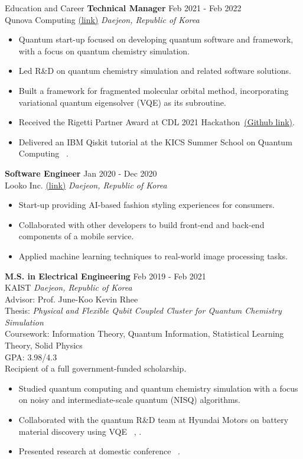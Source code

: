 \documentclass{resume} %
\newcommand*{\AddCiteToCategory}[1]{%
  \AtNextCite{\AtEachCitekey{#1}}}
\newcommand{\citeJour}{\AddCiteToCategory{J}\cite}
\newcommand{\citePate}{\AddCiteToCategory{P}\cite}
\newcommand{\citeConf}{\AddCiteToCategory{C}\cite}
\begin{document}
\begin{rSection}{Education and Career}
{\bf Technical Manager} \hfill {Feb 2021 - Feb 2022}\\
Qunova Computing \href{https://qunovacomputing.com/}{(link)} \hfill \textit{Daejeon, Republic of Korea}
 \begin{itemize}
    \itemsep -3pt {} 
     \item Quantum start-up focused on developing quantum software and framework, with a focus on quantum chemistry simulation.
     \item Led R\&D on quantum chemistry simulation and related software solutions.
     \item Built a framework for fragmented molecular orbital method, incorporating variational quantum eigensolver (VQE) as its subroutine.
     \item Received the Rigetti Partner Award at CDL 2021 Hackathon~\href{https://github.com/CDL-Quantum/Hackathon2021}{(Github link)}.
     \item Delivered an IBM Qiskit tutorial at the KICS Summer School on Quantum Computing~\citeConf{KICS2021Tutorial}.
 \end{itemize}

{\bf Software Engineer} \hfill Jan 2020 - Dec 2020\\
Looko Inc. \href{https://www.acloset.app/}{(link)} \hfill \textit{Daejeon, Republic of Korea}
 \begin{itemize}
    \itemsep -3pt {} 
    \item Start-up providing AI-based fashion styling experiences for consumers.
    \item Collaborated with other developers to build front-end and back-end components of a mobile service.
    \item Applied machine learning techniques to real-world image processing tasks.
 \end{itemize}

{\bf M.S. in Electrical Engineering} \hfill {Feb 2019 - Feb 2021}\\
KAIST \hfill \textit{Daejeon, Republic of Korea}\\
Advisor: Prof. June-Koo Kevin Rhee\\
Thesis: \textit{Physical and Flexible Qubit Coupled Cluster for Quantum Chemistry Simulation}\\
Coursework: Information Theory, Quantum Information, Statistical Learning Theory, Solid Physics\\
GPA: 3.98/4.3\\
Recipient of a full government-funded scholarship.
\begin{itemize}
    \itemsep -3pt {} 
    \item Studied quantum computing and quantum chemistry simulation with a focus on noisy and intermediate-scale quantum (NISQ) algorithms.
    \item Collaborated with the quantum R\&D team at Hyundai Motors on battery material discovery using VQE~\citeJour{D3CP05570A},\citePate{bosonicapprox}.
    \item Presented research at domestic conference~\citeConf{KICS2021WINTER, KICS2020SUMMER}.
\end{itemize}


\end{rSection}
\end{document}

